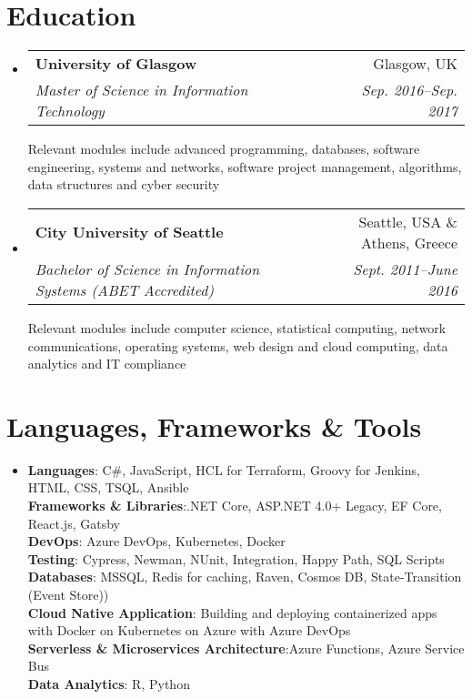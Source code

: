\documentclass[letterpaper,10pt]{article}
\makeatletter
\newcommand{\resumeItem}[1]{
  \item\small{
    {#1 \vspace{-1pt}}
  }
}
\newcommand{\resumeSubheading}[4]{
  \item
    \begin{tabular*}{0.97\textwidth}[t]{l@{\extracolsep{\fill}}r}
      \textbf{#1} & #2 \\
      \textit{\small#3} & \textit{\small #4} \\
    \end{tabular*}\vspace{1mm}
}
\newcommand{\resumeSubHeadingListStart}{\begin{itemize}[leftmargin=0.15in, label={}]}
\newcommand{\resumeSubHeadingListEnd}{\end{itemize}}
\makeatother
\begin{document}
\section{Education}
  \resumeSubHeadingListStart
    \resumeSubheading
      {University of Glasgow}{Glasgow, UK}
      {Master of Science in Information Technology}{Sep. 2016--Sep. 2017}
      \small{Relevant modules include advanced programming, databases, software engineering, systems and networks, software project management, algorithms, data structures and cyber security}
    \resumeSubheading
      {City University of Seattle}{Seattle, USA \& Athens, Greece}
      {Bachelor of Science in Information Systems (ABET Accredited)}{Sept. 2011--June 2016}
      \small{Relevant modules include computer science, statistical computing, network communications, operating systems, web design and cloud computing, data analytics and IT compliance}
  \resumeSubHeadingListEnd

\section{Languages, Frameworks \& Tools}
  \resumeSubHeadingListStart
    \resumeItem{
      \textbf{Languages}{: C\#, JavaScript, HCL for Terraform, Groovy for Jenkins, HTML, CSS, TSQL, Ansible} \\[1mm]
      \textbf{Frameworks \& Libraries}{:.NET Core, ASP.NET 4.0+ Legacy, EF Core, React.js, Gatsby} \\[1mm]
      \textbf{DevOps}{: Azure DevOps, Kubernetes, Docker} \\[1mm]
      \textbf{Testing}{: Cypress, Newman, NUnit, Integration, Happy Path, SQL Scripts} \\[1mm]
      \textbf{Databases}{: MSSQL, Redis for caching, Raven, Cosmos DB, State-Transition (Event Store))} \\[1mm]
      \textbf{Cloud Native Application}{: Building and deploying containerized apps with Docker on Kubernetes on Azure with Azure DevOps} \\[1mm]
      \textbf{Serverless \& Microservices Architecture}{:Azure Functions, Azure Service Bus} \\[1mm]
      \textbf{Data Analytics}{: R, Python}
    }
  \resumeSubHeadingListEnd

\end{document}
